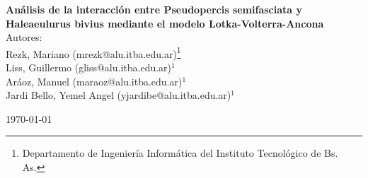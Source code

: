 \documentclass{article}
\numberwithin{equation}{section}
\begin{document}

\begin{center}

{ \LARGE \bfseries Análisis de la interacción entre Pseudopercis semifasciata y Haleaeulurus bivius mediante el modelo Lotka-Volterra-Ancona}\\[0.4cm]
\large Autores: \\
\large Rezk, Mariano (mrezk@alu.itba.edu.ar)\footnote{Departamento de Ingeniería Informática del Instituto Tecnológico de Bs. As.}\\
\large Liss, Guillermo (gliss@alu.itba.edu.ar)$^1$  \\
\large Aráoz, Manuel (maraoz@alu.itba.edu.ar)$^1$  \\
\large Jardi Bello, Yemel Angel (yjardibe@alu.itba.edu.ar)$^1$ \\

\vspace{0.5cm}

{\large \today}

\end{center}



\begin{abstract}
\noindent En el presente artículo se comentan los resultados de simular la interacción predador-presa, basado en el modelo propuesto
por Lotka-Volterra-Ancona. Se ajusta un parámetro del modelo a partir de muestras experimentales y los demás parámetros bióticos, 
y luego se analizan las condiciones de estabilidad del modelo. También se estudia la influencia de los distintos parámetros
del modelo en su comportamiento, se obtiene una simplificación lineal del modelo para poblaciones cercanas al equilibrio,
y se elaboran conclusiones.

\end{abstract}
\end{document}
